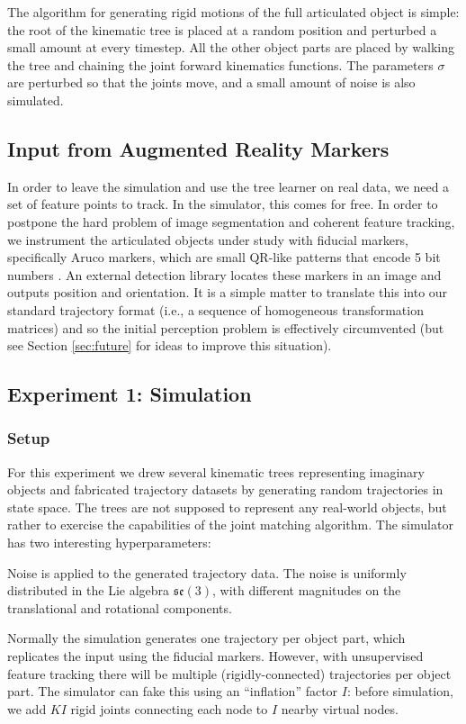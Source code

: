 \documentclass[a4paper,orivec]{llncs}
\begin{document}
The algorithm for generating rigid motions of the full articulated object is simple: the root of the kinematic tree is placed at a random position and perturbed a small amount at every timestep. All the other object parts are placed by walking the tree and chaining the joint forward kinematics functions. The parameters $\sigma$ are perturbed so that the joints move, and a small amount of noise is also simulated.

\subsection{Input from Augmented Reality Markers}
In order to leave the simulation and use the tree learner on real data, we need a set of feature points to track. In the simulator, this comes for free. In order to postpone the hard problem of image segmentation and coherent feature tracking, we instrument the articulated objects under study with fiducial markers, specifically Aruco markers, which are small QR-like patterns that encode 5 bit numbers \cite{aruco}. An external detection library locates these markers in an image and outputs position and orientation. It is a simple matter to translate this into our standard trajectory format (i.e., a sequence of homogeneous transformation matrices) and so the initial perception problem is effectively circumvented (but see Section \ref{sec:future} for ideas to improve this situation).


\subsection{Experiment 1: Simulation}
\subsubsection{Setup}
For this experiment we drew several kinematic trees representing imaginary objects and fabricated trajectory datasets by generating random trajectories in state space. The trees are not supposed to represent any real-world objects, but rather to exercise the capabilities of the joint matching algorithm. The simulator has two interesting hyperparameters:
\begin{enumerate*}
  \item Noise is applied to the generated trajectory data. The noise is uniformly distributed in the Lie algebra $\mathfrak{se}(3)$, with different magnitudes on the translational and rotational components.
  \item Normally the simulation generates one trajectory per object part, which replicates the input using the fiducial markers. However, with unsupervised feature tracking there will be multiple (rigidly-connected) trajectories per object part. The simulator can fake this using an ``inflation'' factor $I$: before simulation, we add $KI$ rigid joints connecting each node to $I$ nearby virtual nodes.
\end{enumerate*}
\end{document}
